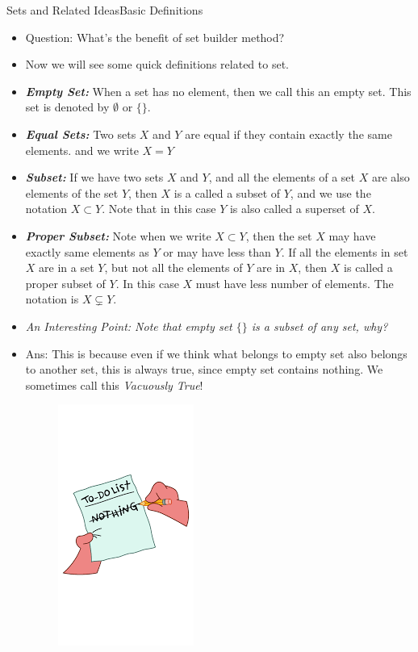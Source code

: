 \documentclass[8pt,usepdftitle=false]{beamer}
\begin{document}
\begin{frame}[allowframebreaks]{Sets and Related Ideas}{Basic Definitions}
\begin{itemize}
\item Question: What's the benefit of set builder method?


\framebreak

\item Now we will see some quick definitions related to set.

\item \textbf{\emph{Empty Set:}} When a set has no element, then we call this an \alert{empty set}. This set is denoted by $\emptyset$ or $\{\}$.

\item \textbf{\emph{Equal Sets:}} Two sets $X$ and $Y$ are equal if they contain exactly the same elements. and we write $X=Y$

\item \textbf{\emph{Subset:}}   If we have two sets $X$ and $Y$, and all the elements of a set $X$ are also elements of the set $Y$, then $X$ is a called a \alert{subset} of $Y$, and we use the notation $X \subset Y$. Note that in this case $Y$ is also called a \alert{superset} of $X$. 


\item \textbf{\emph{Proper Subset:}} Note when we write $X \subset Y$, then the set $X$ may have exactly same elements as $Y$ or may have less than $Y$. If all the elements in set $X$ are in a set $Y$, but not all the elements of $Y$ are in $X$, then $X$ is called a \alert{proper subset} of $Y$. In this case $X$ must have less number of elements. The notation is $X \subsetneq Y$. 

\framebreak

\item \emph{An Interesting Point: Note that empty set $\{ \}$ is a subset of any set, why?} 

\item Ans: This is because even if we think what belongs to empty set also belongs to another set, this is always true, since empty set contains nothing. We sometimes call this \emph{Vacuously True}!

\begin{figure}[H]
\includegraphics[scale = .5]{Images/nothing.png}
\end{figure}



\end{itemize}
\end{frame}
\end{document}
